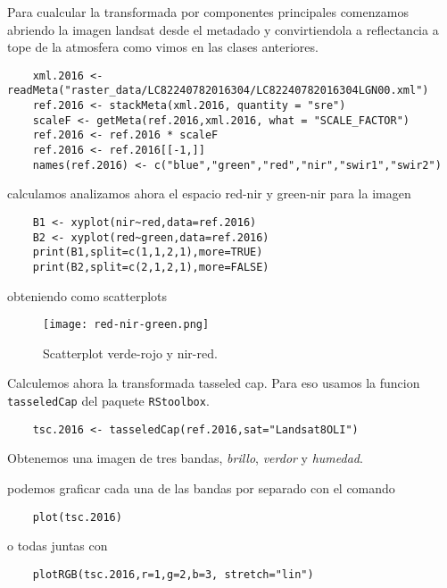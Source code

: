 \begin{exa}
    Para cualcular la transformada por componentes principales comenzamos
    abriendo la imagen landsat desde el metadado y convirtiendola a reflectancia
    a tope de la atmosfera como vimos en las clases anteriores.
    \begin{lstlisting}
    xml.2016 <- readMeta("raster_data/LC82240782016304/LC82240782016304LGN00.xml")
    ref.2016 <- stackMeta(xml.2016, quantity = "sre")
    scaleF <- getMeta(ref.2016,xml.2016, what = "SCALE_FACTOR")
    ref.2016 <- ref.2016 * scaleF
    ref.2016 <- ref.2016[[-1,]]
    names(ref.2016) <- c("blue","green","red","nir","swir1","swir2")
    \end{lstlisting}
    calculamos analizamos ahora el espacio red-nir y green-nir para la imagen
    
    \begin{lstlisting}
    B1 <- xyplot(nir~red,data=ref.2016)
    B2 <- xyplot(red~green,data=ref.2016)
    print(B1,split=c(1,1,2,1),more=TRUE)
    print(B2,split=c(2,1,2,1),more=FALSE)
    \end{lstlisting}
    
    obteniendo como scatterplots

    \begin{figure}
    \begin{center}
        \texttt{[image: red-nir-green.png]}
    \end{center}
    \caption{Scatterplot verde-rojo y nir-red.}
    \label{fig:green-red}
    \end{figure}
    
    Calculemos ahora la transformada tasseled cap. Para eso usamos la funcion
    \texttt{tasseledCap} del paquete \texttt{RStoolbox}.
    \begin{lstlisting}
    tsc.2016 <- tasseledCap(ref.2016,sat="Landsat8OLI")
    \end{lstlisting}
    Obtenemos una imagen de tres bandas, \emph{brillo}, \emph{verdor} y
    \emph{humedad}.

    podemos graficar cada una de las bandas por separado con el comando 

    \begin{lstlisting}
    plot(tsc.2016)
    \end{lstlisting}

    o todas juntas con

    \begin{lstlisting}
    plotRGB(tsc.2016,r=1,g=2,b=3, stretch="lin")
    \end{lstlisting}


\end{exa}
